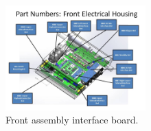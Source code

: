 \begin{figure}
	\centering
	\includegraphics[width=0.48\textwidth]{./pictures/pcb.jpg}
	\caption{Front assembly interface board.}
	\label{fig:pcb}
\end{figure}
